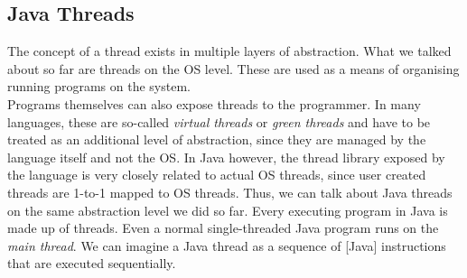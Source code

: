 \documentclass[main]{subfiles}
\begin{document}
%
%
\subsection{Java Threads}
The concept of a thread exists in multiple layers of abstraction. What we talked about so far are threads on the OS level. These are used as a means of organising running programs on the system.\\
Programs themselves can also expose threads to the programmer. In many languages, these are so-called \textit{virtual threads} or \textit{green threads} and have to be treated as an additional level of abstraction, since they are managed by the language itself and not the OS. In Java however, the thread library exposed by the language is very closely related to actual OS threads, since user created threads are 1-to-1 mapped to OS threads. Thus, we can talk about Java threads on the same abstraction level we did so far. Every executing program in Java is made up of threads. Even a normal single-threaded Java program runs on the \textit{main thread}.
We can imagine a Java thread as a sequence of [Java] instructions that are executed sequentially.
\end{document}
